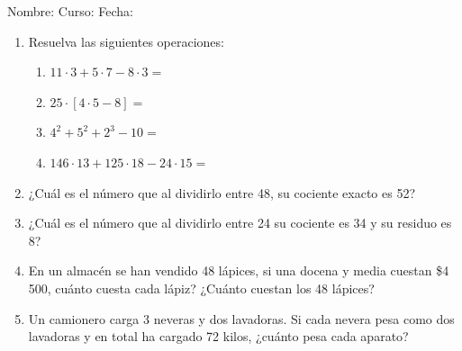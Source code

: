 \documentclass[letterpaper,fleqn]{article}
\newcommand{\LineaNombre}{%
\par
\vspace{\baselineskip}
Nombre:\hrulefill \; Curso: \underline{\hspace*{48pt}} \; Fecha: \underline{\hspace*{2.5cm}} \relax
\par}
\begin{document}
\LineaNombre
\begin{enumerate}
\item Resuelva las siguientes operaciones:
\begin{enumerate}
\item $11\cdot 3+5\cdot 7-8\cdot 3=$ \noanswer
\item $25\cdot [4\cdot 5-8]=$ \noanswer
\item $4^{2}+5^{2}+2^{3}-10=$\noanswer
\item $146\cdot 13+125\cdot 18-24\cdot 15=$  \noanswer
\end{enumerate}
 \item ¿Cuál es el número que al dividirlo entre 48, su cociente exacto es 52?\noanswer
 \newpage
 \item ¿Cuál es el número que al dividirlo entre 24 su cociente es 34 y su residuo es 8? \noanswer
 \item En un almacén se han vendido 48 lápices, si una docena y media cuestan \$4\,500, cuánto cuesta cada lápiz? ¿Cuánto cuestan los 48 lápices?\noanswer
 \item Un camionero carga 3 neveras y dos lavadoras. Si cada nevera pesa como dos lavadoras y en total ha cargado 72 kilos, ¿cuánto pesa cada aparato?\noanswer
 \end{enumerate}
\end{document}
